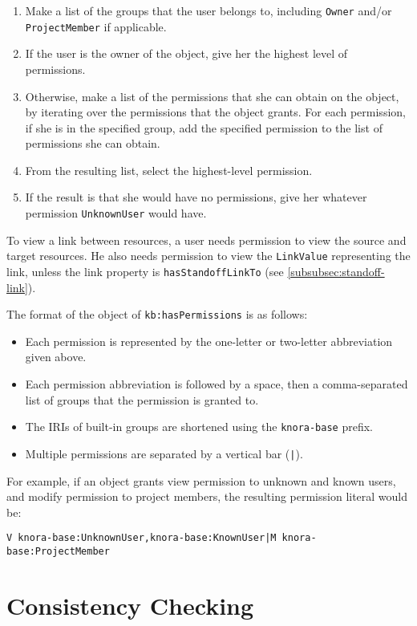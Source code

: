 \documentclass[12pt, a4paper]{article}
\begin{document}
\begin{enumerate}
	\item Make a list of the groups that the user belongs to, including \texttt{Owner} and/or \texttt{ProjectMember} if applicable.
	\item If the user is the owner of the object, give her the highest level of permissions.
	\item Otherwise, make a list of the permissions that she can obtain on the object, by iterating over the permissions that the object grants. For each permission, if she is in the specified group, add the specified permission to the list of permissions she can obtain.
    \item From the resulting list, select the highest-level permission.
    \item If the result is that she would have no permissions, give her whatever permission \texttt{UnknownUser} would have.
\end{enumerate}

To view a link between resources, a user needs permission to view the source and target resources. He also needs permission to view the \texttt{LinkValue} representing the link, unless the link property is \texttt{hasStandoffLinkTo} (see \ref{subsubsec:standoff-link}).

The format of the object of \texttt{kb:hasPermissions} is as follows:

\begin{itemize}
	\item Each permission is represented by the one-letter or two-letter abbreviation given above.
	\item Each permission abbreviation is followed by a space, then a comma-separated list of groups that the permission is granted to.
	\item The IRIs of built-in groups are shortened using the \texttt{knora-base} prefix.
	\item Multiple permissions are separated by a vertical bar (\texttt{|}).
\end{itemize}

For example, if an object grants view permission to unknown and known users, and modify permission to project members, the resulting permission literal would be:

\begin{verbatim}
V knora-base:UnknownUser,knora-base:KnownUser|M knora-base:ProjectMember
\end{verbatim}

\section{Consistency Checking}
\end{document}
